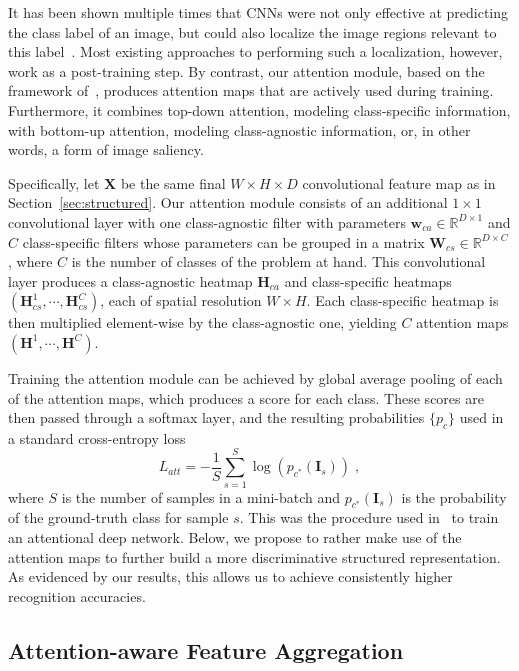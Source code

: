 \documentclass{bmvc2k}
\newcommand{\bX}{\mathbf{X}}
\newcommand{\bI}{\mathbf{I}}
\newcommand{\bW}{\mathbf{W}}
\newcommand{\bw}{\mathbf{w}}
\newcommand{\bH}{\mathbf{H}}
\begin{document}
It has been shown multiple times that CNNs were not only effective at predicting the class label of an image, but could also localize the image regions relevant to this label~\cite{CAM,CWCAM,gradCAM}. Most existing approaches to performing such a localization, however, work as a post-training step. By contrast, our attention module, based on the framework of~\cite{Attpool}, produces attention maps that are actively used during training. Furthermore, it combines top-down attention, modeling class-specific information, with bottom-up attention, modeling class-agnostic information, or, in other words, a form of image saliency.

Specifically, let $\bX$ be the same final $W \times H \times D$ convolutional feature map as in Section~\ref{sec:structured}. Our attention module consists of an additional $1 \times 1$ convolutional layer with one class-agnostic filter with parameters $\bw_{ca} \in \mathbb{R}^{D \times 1}$ and $C$ class-specific filters whose parameters can be grouped in a matrix $\bW_{cs} \in \mathbb{R}^{D \times C}$, where $C$ is the number of classes of the problem at hand. This convolutional layer produces a class-agnostic heatmap $\bH_{ca}$  and class-specific heatmaps $(\bH_{cs}^{1},\cdots,\bH_{cs}^{C})$, each of spatial resolution $W \times H$. Each class-specific heatmap is then multiplied element-wise by the class-agnostic one, yielding $C$ attention maps $(\bH^{1},\cdots,\bH^{C})$.

Training the attention module can be achieved by global average pooling of each of the attention maps, which produces a score for each class. These scores are then passed through a softmax layer, and the resulting probabilities $\{p_c\}$ used in a standard cross-entropy loss
\begin{equation}
L_{att} = - \frac{1}{S} \sum_{s=1}^S \log(p_{c^*}(\bI_s))\;,
\label{eq:att_loss}
\end{equation}
where $S$ is the number of samples in a mini-batch and $p_{c^*}(\bI_s)$ is the probability of the ground-truth class for sample $s$. This was the procedure used in~\cite{Attpool} to train an attentional deep network. Below, we propose to rather make use of the attention maps to further build a more discriminative structured representation. As evidenced by our results, this allows us to achieve consistently higher recognition accuracies.

\subsection{Attention-aware Feature Aggregation}
\end{document}
